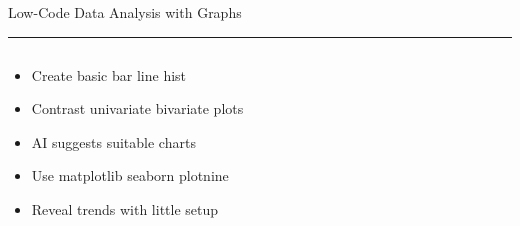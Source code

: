 \documentclass[aspectratio=169]{beamer}
\newcommand{\TitleFont}{\rmfamily}
\begin{document}
\begin{frame}[t]{}
  \vspace*{0.5cm}
  {\TitleFont\fontsize{18}{22}\selectfont\color{LUBronze}Low-Code Data Analysis with Graphs\par}
  \vspace{0.3em}
  {\color{LUBronze}\rule{\linewidth}{0.8pt}}\par
  \vspace{0.2cm}
  \begin{columns}[t]
    \begin{column}[t]{0.4\textwidth}
      \vspace*{0pt}
      \begin{itemize}\setlength\itemsep{0.65em}
        \item Create basic bar line hist
        \item Contrast univariate bivariate plots
        \item AI suggests suitable charts
        \item Use matplotlib seaborn plotnine
        \item Reveal trends with little setup
      \end{itemize}
    \end{column}
  \end{columns}
\end{frame}
\end{document}
